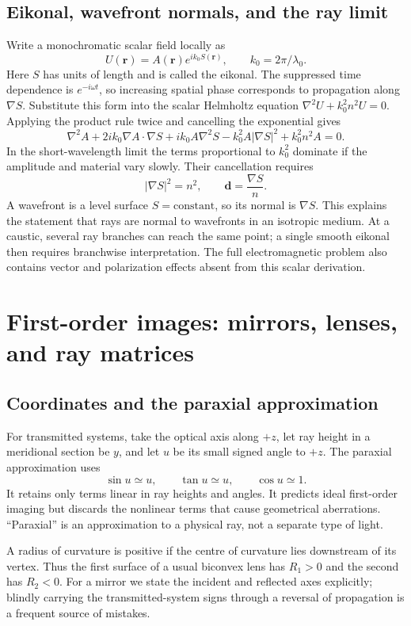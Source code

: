 \section{Eikonal, wavefront normals, and the ray limit}
Write a monochromatic scalar field locally as
\[
U(\bm{r})=A(\bm{r})e^{ik_0S(\bm{r})},\qquad k_0=2\pi/\lambda_0.
\]
Here $S$ has units of length and is called the eikonal. The suppressed time dependence is $e^{-i\omega t}$, so increasing spatial phase corresponds to propagation along $\nabla S$. Substitute this form into the scalar Helmholtz equation $\nabla^2U+k_0^2n^2U=0$. Applying the product rule twice and cancelling the exponential gives
\[
\nabla^2A+2ik_0\nabla A\cdot\nabla S
+ik_0A\nabla^2S-k_0^2A|\nabla S|^2+k_0^2n^2A=0.
\]
In the short-wavelength limit the terms proportional to $k_0^2$ dominate if the amplitude and material vary slowly. Their cancellation requires
\begin{equation}
|\nabla S|^2=n^2,\qquad \bm{d}=\frac{\nabla S}{n}.
\label{fnd:eikonal}
\end{equation}
A wavefront is a level surface $S=\mathrm{constant}$, so its normal is $\nabla S$. This explains the statement that rays are normal to wavefronts in an isotropic medium. At a caustic, several ray branches can reach the same point; a single smooth eikonal then requires branchwise interpretation. The full electromagnetic problem also contains vector and polarization effects absent from this scalar derivation.

\chapter{First-order images: mirrors, lenses, and ray matrices}
\label{fnd:imaging}
\section{Coordinates and the paraxial approximation}
For transmitted systems, take the optical axis along $+z$, let ray height in a meridional section be $y$, and let $u$ be its small signed angle to $+z$. The paraxial approximation uses
\[
\sin u\simeq u,\qquad \tan u\simeq u,\qquad \cos u\simeq1.
\]
It retains only terms linear in ray heights and angles. It predicts ideal first-order imaging but discards the nonlinear terms that cause geometrical aberrations. ``Paraxial'' is an approximation to a physical ray, not a separate type of light.

A radius of curvature is positive if the centre of curvature lies downstream of its vertex. Thus the first surface of a usual biconvex lens has $R_1>0$ and the second has $R_2<0$. For a mirror we state the incident and reflected axes explicitly; blindly carrying the transmitted-system signs through a reversal of propagation is a frequent source of mistakes.

